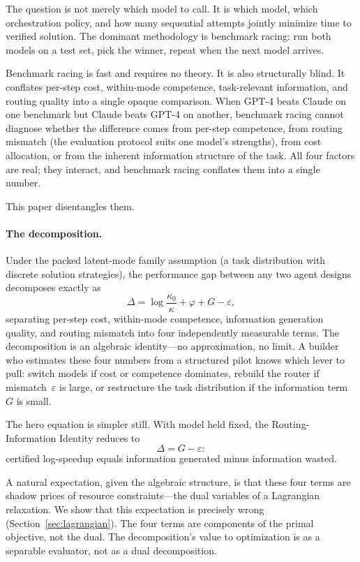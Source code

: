 \documentclass[twoside,11pt]{article}
\begin{document}
The question is not merely which model to call.
It is which model, which orchestration policy, and how many sequential attempts jointly minimize time to verified solution.
The dominant methodology is benchmark racing: run both models on a test set, pick the winner, repeat when the next model arrives.

Benchmark racing is fast and requires no theory.
It is also structurally blind.
It conflates per-step cost, within-mode competence, task-relevant information, and routing quality into a single opaque comparison.
When GPT-4 beats Claude on one benchmark but Claude beats GPT-4 on another, benchmark racing cannot diagnose whether the difference comes from per-step competence, from routing mismatch (the evaluation protocol suits one model's strengths), from cost allocation, or from the inherent information structure of the task.
All four factors are real; they interact, and benchmark racing conflates them into a single number.

This paper disentangles them.

\paragraph{The decomposition.}
Under the packed latent-mode family assumption (a task distribution with discrete solution strategies), the performance gap between any two agent designs decomposes exactly as
\begin{equation}
\label{eq:four-term-intro}
\Delta = \log\frac{\kappa_0}{\kappa} + \varphi + G - \varepsilon,
\end{equation}
separating per-step cost, within-mode competence, information generation quality, and routing mismatch into four independently measurable terms.
The decomposition is an algebraic identity---no approximation, no limit.
A builder who estimates these four numbers from a structured pilot knows which lever to pull: switch models if cost or competence dominates, rebuild the router if mismatch~$\varepsilon$ is large, or restructure the task distribution if the information term~$G$ is small.

The hero equation is simpler still.
With model held fixed, the Routing-Information Identity reduces to
\[
\Delta = G - \varepsilon:
\]
certified log-speedup equals information generated minus information wasted.

A natural expectation, given the algebraic structure, is that these four terms are shadow prices of resource constraints---the dual variables of a Lagrangian relaxation.
We show that this expectation is precisely wrong (Section~\ref{sec:lagrangian}).
The four terms are components of the primal objective, not the dual.
The decomposition's value to optimization is as a separable evaluator, not as a dual decomposition.
\end{document}
